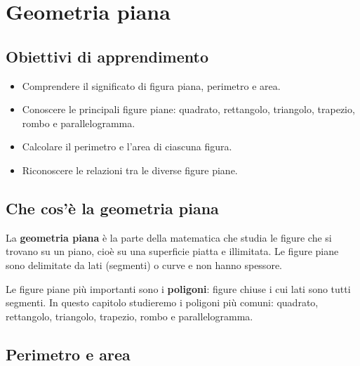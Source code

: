 
\chapter{Geometria piana}

\section*{Obiettivi di apprendimento}
\begin{itemize}[leftmargin=1.5em]
    \item Comprendere il significato di figura piana, perimetro e area.
    \item Conoscere le principali figure piane: quadrato, rettangolo, triangolo, trapezio, rombo e parallelogramma.
    \item Calcolare il perimetro e l'area di ciascuna figura.
    \item Riconoscere le relazioni tra le diverse figure piane.
\end{itemize}

\section{Che cos'è la geometria piana}

\begin{definizione}
    La \textbf{geometria piana} è la parte della matematica che studia le figure che si trovano su un piano, cioè su una superficie piatta e illimitata. Le figure piane sono delimitate da lati (segmenti) o curve e non hanno spessore.
\end{definizione}

Le figure piane più importanti sono i \textbf{poligoni}: figure chiuse i cui lati sono tutti segmenti. In questo capitolo studieremo i poligoni più comuni: quadrato, rettangolo, triangolo, trapezio, rombo e parallelogramma.

\section{Perimetro e area}

